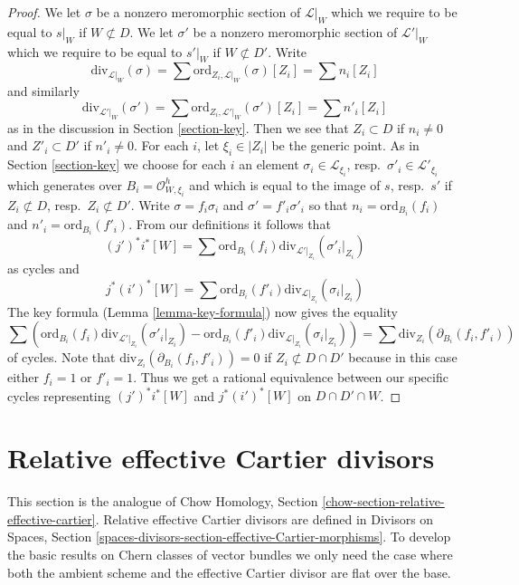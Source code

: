 \begin{proof}
\medskip\noindent
We let $\sigma$ be a nonzero meromorphic section of $\mathcal{L}|_W$
which we require to be equal to $s|_W$ if $W \not \subset D$.
We let $\sigma'$ be a nonzero meromorphic section of $\mathcal{L}'|_W$
which we require to be equal to $s'|_W$ if $W \not \subset D'$.
Write
$$
\text{div}_{\mathcal{L}|_W}(\sigma) =
\sum \text{ord}_{Z_i, \mathcal{L}|_W}(\sigma)[Z_i] = \sum n_i[Z_i]
$$
and similarly
$$
\text{div}_{\mathcal{L}'|_W}(\sigma') =
\sum \text{ord}_{Z_i, \mathcal{L}'|_W}(\sigma')[Z_i] = \sum n'_i[Z_i]
$$
as in the discussion in Section \ref{section-key}.
Then we see that $Z_i \subset D$ if $n_i \not = 0$ and
$Z'_i \subset D'$ if $n'_i \not = 0$. For each $i$, let $\xi_i \in |Z_i|$
be the generic point. As in Section \ref{section-key} we choose
for each $i$ an element
$\sigma_i \in \mathcal{L}_{\xi_i}$, resp.\ $\sigma'_i \in \mathcal{L}'_{\xi_i}$
which generates over $B_i = \mathcal{O}_{W, \xi_i}^h$
and which is equal to the image of
$s$, resp.\ $s'$ if $Z_i \not \subset D$, resp.\ $Z_i \not \subset D'$.
Write $\sigma = f_i \sigma_i$ and $\sigma' = f'_i\sigma'_i$ so that
$n_i = \text{ord}_{B_i}(f_i)$ and
$n'_i = \text{ord}_{B_i}(f'_i)$.
From our definitions it follows that
$$
(j')^*i^*[W] =
\sum \text{ord}_{B_i}(f_i) \text{div}_{\mathcal{L}'|_{Z_i}}(\sigma'_i|_{Z_i})
$$
as cycles and
$$
j^*(i')^*[W] =
\sum \text{ord}_{B_i}(f'_i) \text{div}_{\mathcal{L}|_{Z_i}}(\sigma_i|_{Z_i})
$$
The key formula (Lemma \ref{lemma-key-formula}) now gives the equality
$$
\sum \left(
\text{ord}_{B_i}(f_i) \text{div}_{\mathcal{L}'|_{Z_i}}(\sigma'_i|_{Z_i}) -
\text{ord}_{B_i}(f'_i) \text{div}_{\mathcal{L}|_{Z_i}}(\sigma_i|_{Z_i})
\right) =
\sum \text{div}_{Z_i}(\partial_{B_i}(f_i, f'_i))
$$
of cycles. Note that $\text{div}_{Z_i}(\partial_{B_i}(f_i, f'_i)) = 0$ if
$Z_i \not \subset D \cap D'$ because in this case either $f_i = 1$
or $f'_i = 1$. Thus we get a rational equivalence between our specific
cycles representing $(j')^*i^*[W]$ and $j^*(i')^*[W]$ on $D \cap D' \cap W$.
\end{proof}










\section{Relative effective Cartier divisors}
\label{section-relative-effective-cartier}

\noindent
This section is the analogue of
Chow Homology, Section \ref{chow-section-relative-effective-cartier}.
Relative effective Cartier divisors are defined
in Divisors on Spaces, Section
\ref{spaces-divisors-section-effective-Cartier-morphisms}.
To develop the basic results on Chern classes of vector bundles
we only need the case where both the ambient scheme and the effective
Cartier divisor are flat over the base.


